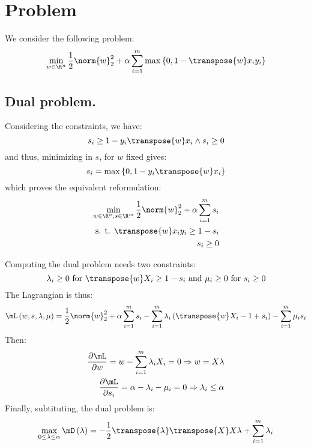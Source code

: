 \documentclass[math, info]{cours}
\begin{document}
\section{Problem}
We consider the following problem:
\begin{equation}
	\min_{w \in \R^{n}} \frac{1}{2}\norm{w}_{2}^{2} + \alpha\sum_{i = 1}^{m} \max\left\{ 0, 1 - \transpose{w}x_{i}y_{i} \right\}
	\label{SVM}
\end{equation}
\subsection{Dual problem.}
Considering the constraints, we have:
\begin{equation*}
	s_{i} \geq 1 - y_{i}\transpose{w}x_{i} \land s_{i} \geq 0
\end{equation*}
and thus, minimizing in $s$, for $w$ fixed gives:
\begin{equation*}
	s_{i} = \max \left\{ 0, 1 - y_{i}\transpose{w}x_{i} \right\}
\end{equation*}
which proves the equivalent reformulation:
\begin{equation*}
	\begin{aligned}
	\min_{w\in \R^{n}, s\in \R^{m}} \frac{1}{2}\norm{w}_{2}^{2} + \alpha\sum_{i = 1}^{m} s_{i}&\\
	\text{s. t. } \transpose{w}x_{i}y_{i} \geq 1 - s_{i}&\\
	s_{i}\geq 0&
	\end{aligned}
\end{equation*}

Computing the dual problem needs two constraints:
\begin{equation*}
	\lambda_{i} \geq 0 \text{ for } \transpose{w}X_{i}\geq 1 - s_{i} \text{ and } \mu_{i} \geq 0 \text{ for } s_{i} \geq 0
\end{equation*}
The Lagrangian is thus:
\begin{equation*}
	\mL\left( w, s, \lambda, \mu \right) = \frac{1}{2}\norm{w}_{2}^{2} + \alpha\sum_{i = 1}^{m}s_{i} - \sum_{i = 1}^{m}\lambda_{i}\left( \transpose{w}X_{i} - 1 + s_{i} \right) - \sum_{i = 1}^{m}\mu_{i}s_{i}
\end{equation*}
Then:
\begin{align*}
	\frac{\partial \mL}{\partial w} = w - \sum_{i = 1}^{m}\lambda_{i}X_{i} = 0 \Rightarrow w = X\lambda\\
	\frac{\partial \mL}{\partial s_{i}} = \alpha - \lambda_{i} - \mu_{i} = 0 \Rightarrow \lambda_{i} \leq \alpha
\end{align*}
Finally, subtituting, the dual problem is:
\begin{equation*}
	\max_{0 \leq \lambda \leq \alpha} \mD\left( \lambda \right) = -\frac{1}{2}\transpose{\lambda}\transpose{X}X\lambda + \sum_{i = 1}^{m}\lambda_{i}
\end{equation*}
\end{document}
